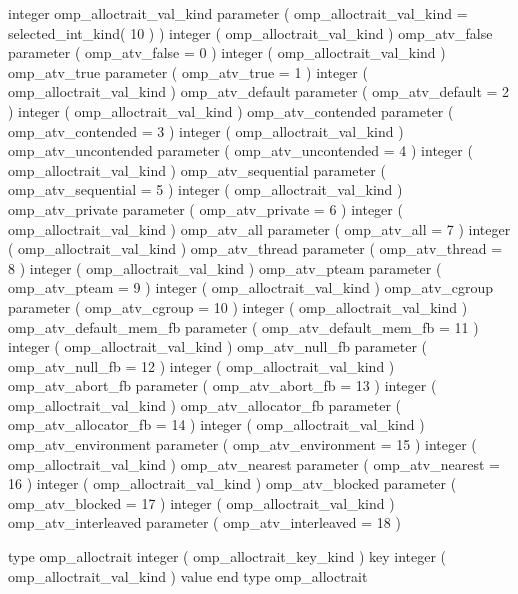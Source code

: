 {\begin{ompfSyntax}
      integer omp_alloctrait_val_kind
      parameter ( omp_alloctrait_val_kind = selected_int_kind( 10 ) )
      integer ( omp_alloctrait_val_kind ) omp_atv_false
      parameter ( omp_atv_false = 0 )
      integer ( omp_alloctrait_val_kind ) omp_atv_true
      parameter ( omp_atv_true = 1 )
      integer ( omp_alloctrait_val_kind ) omp_atv_default
      parameter ( omp_atv_default = 2 )
      integer ( omp_alloctrait_val_kind ) omp_atv_contended
      parameter ( omp_atv_contended = 3 )
      integer ( omp_alloctrait_val_kind ) omp_atv_uncontended
      parameter ( omp_atv_uncontended = 4 )
      integer ( omp_alloctrait_val_kind ) omp_atv_sequential
      parameter ( omp_atv_sequential = 5 )
      integer ( omp_alloctrait_val_kind ) omp_atv_private
      parameter ( omp_atv_private = 6 )
      integer ( omp_alloctrait_val_kind ) omp_atv_all
      parameter ( omp_atv_all = 7 )
      integer ( omp_alloctrait_val_kind ) omp_atv_thread
      parameter ( omp_atv_thread = 8 )
      integer ( omp_alloctrait_val_kind ) omp_atv_pteam
      parameter ( omp_atv_pteam = 9 )
      integer ( omp_alloctrait_val_kind ) omp_atv_cgroup
      parameter ( omp_atv_cgroup = 10 )
      integer ( omp_alloctrait_val_kind ) omp_atv_default_mem_fb
      parameter ( omp_atv_default_mem_fb = 11 )
      integer ( omp_alloctrait_val_kind ) omp_atv_null_fb
      parameter ( omp_atv_null_fb = 12 )
      integer ( omp_alloctrait_val_kind ) omp_atv_abort_fb
      parameter ( omp_atv_abort_fb = 13 )
      integer ( omp_alloctrait_val_kind ) omp_atv_allocator_fb
      parameter ( omp_atv_allocator_fb = 14 )
      integer ( omp_alloctrait_val_kind ) omp_atv_environment
      parameter ( omp_atv_environment = 15 )
      integer ( omp_alloctrait_val_kind ) omp_atv_nearest
      parameter ( omp_atv_nearest = 16 )
      integer ( omp_alloctrait_val_kind ) omp_atv_blocked
      parameter ( omp_atv_blocked = 17 )
      integer ( omp_alloctrait_val_kind ) omp_atv_interleaved
      parameter ( omp_atv_interleaved = 18 )

      type omp_alloctrait
        integer ( omp_alloctrait_key_kind ) key
        integer ( omp_alloctrait_val_kind ) value
      end type omp_alloctrait


\end{ompfSyntax}}
